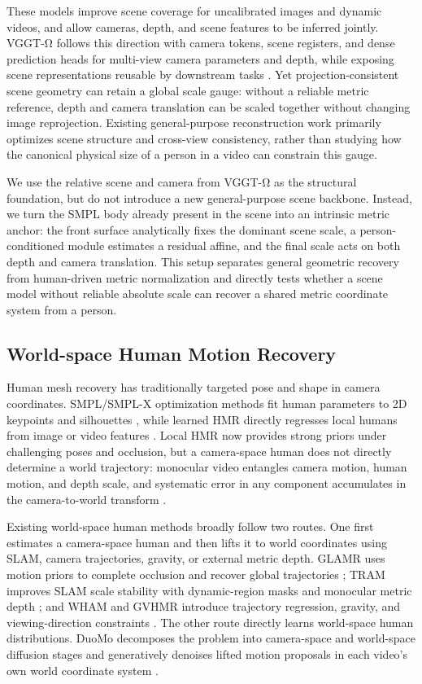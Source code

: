 \documentclass{article}
\begin{document}
These models improve scene coverage for uncalibrated images and dynamic videos, and allow cameras, depth, and scene features to be inferred jointly. VGGT-Ω follows this direction with camera tokens, scene registers, and dense prediction heads for multi-view camera parameters and depth, while exposing scene representations reusable by downstream tasks \citep{wang2026vggtomega}. Yet projection-consistent scene geometry can retain a global scale gauge: without a reliable metric reference, depth and camera translation can be scaled together without changing image reprojection. Existing general-purpose reconstruction work primarily optimizes scene structure and cross-view consistency, rather than studying how the canonical physical size of a person in a video can constrain this gauge.

We use the relative scene and camera from VGGT-Ω as the structural foundation, but do not introduce a new general-purpose scene backbone. Instead, we turn the SMPL body already present in the scene into an intrinsic metric anchor: the front surface analytically fixes the dominant scene scale, a person-conditioned module estimates a residual affine, and the final scale acts on both depth and camera translation. This setup separates general geometric recovery from human-driven metric normalization and directly tests whether a scene model without reliable absolute scale can recover a shared metric coordinate system from a person.

\subsection{World-space Human Motion Recovery}

Human mesh recovery has traditionally targeted pose and shape in camera coordinates. SMPL/SMPL-X optimization methods fit human parameters to 2D keypoints and silhouettes \citep{loper2023smpl,pavlakos2019smplx}, while learned HMR directly regresses local humans from image or video features \citep{chen2026human3r,song2026metrichmsr}. Local HMR now provides strong priors under challenging poses and occlusion, but a camera-space human does not directly determine a world trajectory: monocular video entangles camera motion, human motion, and depth scale, and systematic error in any component accumulates in the camera-to-world transform \citep{wang2026duomo}.

Existing world-space human methods broadly follow two routes. One first estimates a camera-space human and then lifts it to world coordinates using SLAM, camera trajectories, gravity, or external metric depth. GLAMR uses motion priors to complete occlusion and recover global trajectories \citep{yuan2022glamr}; TRAM improves SLAM scale stability with dynamic-region masks and monocular metric depth \citep{wang2024tram}; and WHAM and GVHMR introduce trajectory regression, gravity, and viewing-direction constraints \citep{shin2024wham,shen2024gvhmr}. The other route directly learns world-space human distributions. DuoMo decomposes the problem into camera-space and world-space diffusion stages and generatively denoises lifted motion proposals in each video's own world coordinate system \citep{wang2026duomo}.
\end{document}
